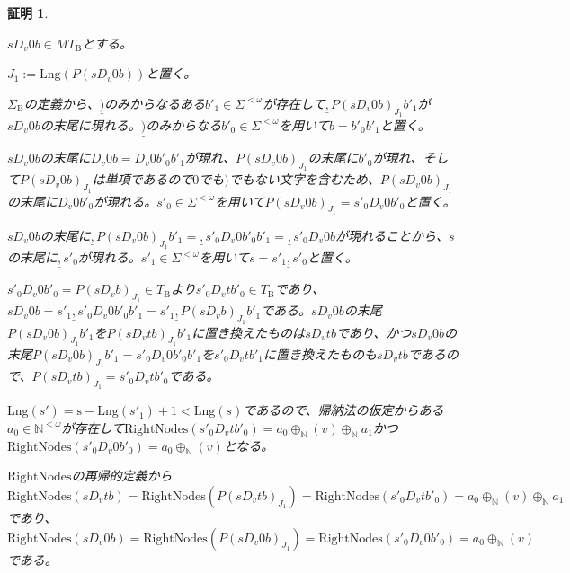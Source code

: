 \documentclass[dvipdfmx,uplatex]{jsarticle}
\theoremstyle{customnonumberbreakfortheorem}
\theoremstyle{customnonumberbreakforproof}
\newtheorem{hideableproof}{証明}
\begin{document}
\begin{hideableproof}
\begin{indented}
\begin{indented}
			\item \(s D_v 0 b \in MT_{\textrm{B}}\)とする。
			\item \(J_1 := \textrm{Lng}(P(s D_v 0 b))\)と置く。
			\item \(\Sigma_{\textrm{B}}\)の定義から、\(\underline{)}\)のみからなるある\(b'_1 \in \Sigma^{< \omega}\)が存在して\(\underline{,} P(s D_v 0 b)_{J_1} b'_1\)が\(s D_v 0 b\)の末尾に現れる。\(\underline{)}\)のみからなる\(b'_0 \in \Sigma^{< \omega}\)を用いて\(b = b'_0 b'_1\)と置く。
			\item \(s D_v 0 b\)の末尾に\(D_v 0 b = D_v 0 b'_0 b'_1\)が現れ、\(P(s D_v 0 b)_{J_1}\)の末尾に\(b'_0\)が現れ、そして\(P(s D_v 0 b)_{J_1}\)は単項であるので\(0\)でも\(\underline{)}\)でもない文字を含むため、\(P(s D_v 0 b)_{J_1}\)の末尾に\(D_v 0 b'_0\)が現れる。\(s'_0 \in \Sigma^{< \omega}\)を用いて\(P(s D_v 0 b)_{J_1} = s'_0 D_v 0 b'_0\)と置く。
			\item \(s D_v 0 b\)の末尾に\(\underline{,} P(s D_v 0 b)_{J_1} b'_1 = \underline{,} s'_0 D_v 0 b'_0 b'_1 = \underline{,} s'_0 D_v 0 b\)が現れることから、\(s\)の末尾に\(\underline{,} s'_0\)が現れる。\(s'_1 \in \Sigma^{< \omega}\)を用いて\(s = s'_1 \underline{,} s'_0\)と置く。
			\item \(s'_0 D_v 0 b'_0 = P(s D_v b)_{J_1} \in T_{\textrm{B}}\)より\(s'_0 D_v t b'_0 \in T_{\textrm{B}}\)であり、\(s D_v 0 b = s'_1 \underline{,} s'_0 D_v 0 b'_0 b'_1 = s'_1 \underline{,} P(s D_v b)_{J_1} b'_1\)である。\(s D_v 0 b\)の末尾\(P(s D_v 0 b)_{J_1} b'_1\)を\(P(s D_v t b)_{J_1} b'_1\)に置き換えたものは\(s D_v t b\)であり、かつ\(s D_v 0 b\)の末尾\(P(s D_v 0 b)_{J_1} b'_1 = s'_0 D_v 0 b'_0 b'_1\)を\(s'_0 D_v t b'_1\)に置き換えたものも\(s D_v t b\)であるので、\(P(s D_v t b)_{J_1} = s'_0 D_v t b'_0\)である。
			\item \(\textrm{Lng}(s') = \textrm{s} - \textrm{Lng}(s'_1) + 1 < \textrm{Lng}(s)\)であるので、帰納法の仮定からある\(a_0 \in \mathbb{N}^{< \omega}\)が存在して\(\textrm{RightNodes}(s'_0 D_v t b'_0) = a_0 \oplus_{\mathbb{N}} (v) \oplus_{\mathbb{N}} a_1\)かつ\(\textrm{RightNodes}(s'_0 D_v 0 b'_0) = a_0 \oplus_{\mathbb{N}} (v)\)となる。
			\item \(\textrm{RightNodes}\)の再帰的定義から\(\textrm{RightNodes}(s D_v t b) = \textrm{RightNodes}(P(s D_v t b)_{J_1}) = \textrm{RightNodes}(s'_0 D_v t b'_0) = a_0 \oplus_{\mathbb{N}} (v) \oplus_{\mathbb{N}} a_1\)であり、\(\textrm{RightNodes}(s D_v 0 b) = \textrm{RightNodes}(P(s D_v 0 b)_{J_1}) = \textrm{RightNodes}(s'_0 D_v 0 b'_0) = a_0 \oplus_{\mathbb{N}} (v)\)である。
		\end{indented}
	\end{indented}
\end{hideableproof}
\end{document}

